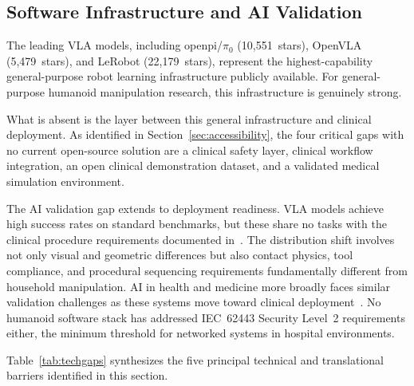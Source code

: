\documentclass[acmsmall]{acmart}
\begin{document}
\subsection{Software Infrastructure and AI Validation}
\label{sec:software}

The leading VLA models, including openpi/$\pi_0$ (10,551~stars), OpenVLA (5,479~stars),
and LeRobot (22,179~stars), represent the highest-capability general-purpose
robot learning infrastructure publicly available. For general-purpose humanoid
manipulation research, this infrastructure is genuinely strong.

What is absent is the layer between this general infrastructure and clinical
deployment. As identified in Section~\ref{sec:accessibility}, the four critical gaps
with no current open-source solution are a clinical safety layer, clinical
workflow integration, an open clinical demonstration dataset, and a validated
medical simulation environment.

The AI validation gap extends to deployment readiness. VLA models achieve high
success rates on standard benchmarks, but these share no tasks with the clinical
procedure requirements documented in~\cite{atar2025humanoids}. The distribution
shift involves not only visual and geometric differences but also contact physics,
tool compliance, and procedural sequencing requirements fundamentally different
from household manipulation. AI in health and medicine more broadly faces similar
validation challenges as these systems move toward clinical
deployment~\cite{topol2019high,rajpurkar2022ai,coiera2019last,sendak2020real}. No humanoid software stack has
addressed IEC~62443 Security Level~2 requirements either, the minimum threshold
for networked systems in hospital environments.

Table~\ref{tab:techgaps} synthesizes the five principal technical and
translational barriers identified in this section.
\end{document}

